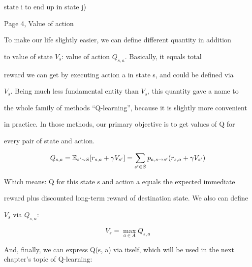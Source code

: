 state i to end up in state j)




Page 4, Value of action


To make our life slightly easier, we can define different quantity in addition

to value of state \begin{math}V_s\end{math}: value of action \begin{math}Q_{s,a}\end{math}. Basically, it equals total

reward we can get by executing action a in state s, and could be defined via

\begin{math}V_s\end{math}. Being much less fundamental entity than \begin{math}V_s\end{math}, this quantity gave a name to

the whole family of methods “Q-learning”, because it is slightly more convenient

in practice. In those methods, our primary objective is to get values of Q for

every pair of state and action.


\begin{equation*}

Q_{s,a} = \E_{s' \sim S}[r_{s,a} + \gamma V_{s'}] =

\sum_{s' \in S} p_{a,s \rightarrow s'}(r_{s,a} + \gamma V_{s'})

\end{equation*}


Which means: Q for this state s and action a equals the expected immediate

reward plus discounted long-term reward of destination state. We also can define

\begin{math}V_s\end{math} via \begin{math}Q_{s, a}\end{math}:


\begin{equation*}

V_s = \max_{a \in A} Q_{s,a}

\end{equation*}


And, finally, we can express Q(s, a) via itself, which will be used in the next chapter’s topic of Q-learning:

